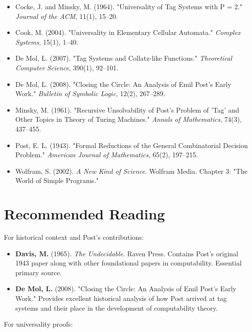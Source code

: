 \begin{itemize}
\item Cocke, J. and Minsky, M. (1964). "Universality of Tag Systems with P = 2." \textit{Journal of the ACM}, 11(1), 15--20.
\item Cook, M. (2004). "Universality in Elementary Cellular Automata." \textit{Complex Systems}, 15(1), 1--40.
\item De Mol, L. (2007). "Tag Systems and Collatz-like Functions." \textit{Theoretical Computer Science}, 390(1), 92--101.
\item De Mol, L. (2008). "Closing the Circle: An Analysis of Emil Post's Early Work." \textit{Bulletin of Symbolic Logic}, 12(2), 267--289.
\item Minsky, M. (1961). "Recursive Unsolvability of Post's Problem of 'Tag' and Other Topics in Theory of Turing Machines." \textit{Annals of Mathematics}, 74(3), 437--455.
\item Post, E. L. (1943). "Formal Reductions of the General Combinatorial Decision Problem." \textit{American Journal of Mathematics}, 65(2), 197--215.
\item Wolfram, S. (2002). \textit{A New Kind of Science}. Wolfram Media. Chapter 3: "The World of Simple Programs."
\end{itemize}



\section{Recommended Reading}

For historical context and Post's contributions:

\begin{itemize}
\item \textbf{Davis, M.} (1965). \textit{The Undecidable}. Raven Press. Contains Post's original 1943 paper along with other foundational papers in computability. Essential primary source.
\end{itemize}

\begin{itemize}
\item \textbf{De Mol, L.} (2008). "Closing the Circle: An Analysis of Emil Post's Early Work." Provides excellent historical analysis of how Post arrived at tag systems and their place in the development of computability theory.
\end{itemize}

For universality proofs:

